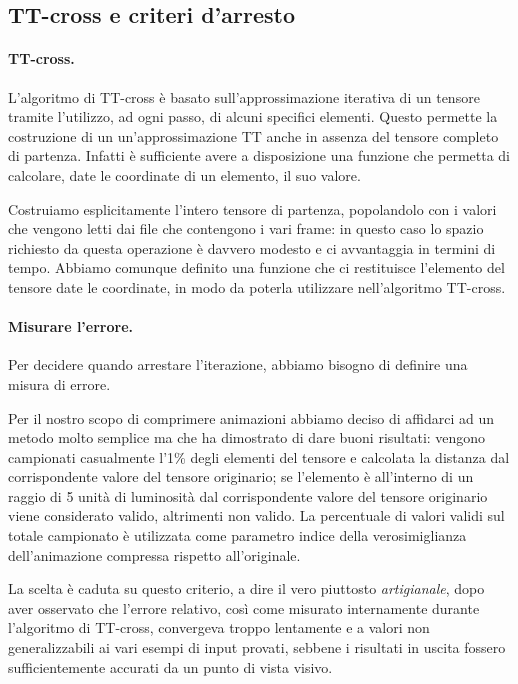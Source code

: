 \documentclass[11pt,a4paper]{article}
\begin{document}
\subsection{TT-cross e criteri d'arresto}
\paragraph{TT-cross.}
L'algoritmo di TT-cross è basato sull'approssimazione iterativa di un tensore tramite l'utilizzo, ad ogni passo, di alcuni specifici elementi.
Questo permette la costruzione di un un'approssimazione TT anche in assenza del tensore completo di partenza. Infatti è sufficiente avere a disposizione una funzione che permetta di calcolare, date le coordinate di un elemento, il suo valore.

Costruiamo esplicitamente l'intero tensore di partenza, popolandolo con i valori che vengono letti dai file che contengono i vari frame: in questo caso lo spazio richiesto da questa operazione è davvero modesto e ci avvantaggia in termini di tempo. Abbiamo comunque definito una funzione che ci restituisce l'elemento del tensore date le coordinate, in modo da poterla utilizzare nell'algoritmo TT-cross.

\paragraph{Misurare l'errore.}
Per decidere quando arrestare l'iterazione, abbiamo bisogno di definire una misura di errore.

Per il nostro scopo di comprimere animazioni abbiamo deciso di affidarci ad un metodo molto semplice ma che ha dimostrato di dare buoni risultati: vengono campionati casualmente l'1\% degli elementi del tensore e calcolata la distanza dal corrispondente valore del tensore originario; se l'elemento è all'interno di un raggio di 5 unità di luminosità dal corrispondente valore del tensore originario viene considerato valido, altrimenti non valido.
La percentuale di valori validi sul totale campionato è utilizzata come parametro indice della verosimiglianza dell'animazione compressa rispetto all'originale.

La scelta è caduta su questo criterio, a dire il vero piuttosto \emph{artigianale}, dopo aver osservato che l'errore relativo, così come misurato internamente durante l'algoritmo di TT-cross, convergeva troppo lentamente e a valori non generalizzabili ai vari esempi di input provati, sebbene i risultati in uscita fossero sufficientemente accurati da un punto di vista visivo.
\end{document}
